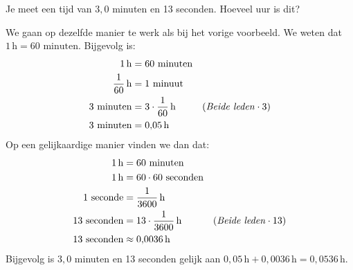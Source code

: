 \documentclass{ximera}
\begin{document}
\begin{example}[foldable=true,title={Voorbeeld: minuten en seconden naar uur omzetten}]\nl
    Je meet een tijd van $3{,}0$ minuten en 13 seconden. Hoeveel uur is dit?

    \begin{solution}\nl
        We gaan op dezelfde manier te werk als bij het vorige voorbeeld. We weten dat $1 \, \mathrm{h} = 60 \text{ minuten}$. Bijgevolg is:
        \begin{align*}
        1 \, \mathrm{h} & = 60 \text{ minuten} \\
        \frac{1}{60} \, \mathrm{h} & = 1 \text{ minuut} \\
        3 \text{ minuten} & = 3 \cdot \frac{1}{60} \, \mathrm{h} & (\text{\textit{Beide leden}} \cdot 3) \\
        3 \text{ minuten} & = 0{,}05 \, \mathrm{h}
        \end{align*}
        Op een gelijkaardige manier vinden we dan dat:
        \begin{align*}
        1 \, \mathrm{h} & = 60 \text{ minuten} \\
        1 \, \mathrm{h} & = 60 \cdot 60 \text{ seconden} \\
        1 \text{ seconde} & = \frac{1}{3600} \, \mathrm{h} \\
        13 \text{ seconden} & = 13 \cdot \frac{1}{3600} \, \mathrm{h} & (\text{\textit{Beide leden}} \cdot 13) \\
        13 \text{ seconden} & \approx 0{,}0036 \, \mathrm{h}
        \end{align*}
        Bijgevolg is $3{,}0$ minuten en 13 seconden gelijk aan $0{,}05 \, \mathrm{h} + 0{,}0036 \, \mathrm{h} = 0{,}0536 \, \mathrm{h}$.
    \end{solution}
\end{example}
\end{document}
